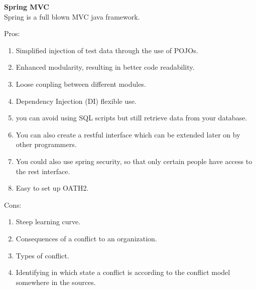 \textbf{Spring MVC} \\
Spring is a full blown MVC java framework.

Pros:
\begin{enumerate}
	\item Simplified injection of test data through the use of POJOs.
	\item Enhanced modularity, resulting in better code readability.
	\item Loose coupling between different modules.
	\item Dependency Injection (DI) flexible use.
	\item you can avoid using SQL scripts but still retrieve data from your database.
	\item You can also create a restful interface which can be extended later on by other programmers.
	\item You could also use spring security, so that only certain people have access to the rest interface.
	\item Easy to set up OATH2. 
\end{enumerate}
Cons:
\begin{enumerate}
	\item Steep learning curve.
	\item Consequences of a conflict to an organization.
	\item Types of conflict.
	\item Identifying in which state a conflict is according to the conflict model somewhere in the sources.
\end{enumerate}